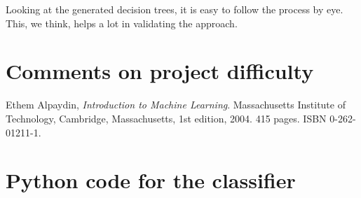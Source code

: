 \documentclass[a4paper,10pt]{article}
\begin{document}
Looking at the generated decision trees, it is easy to follow the
process by eye.  This, we think, helps a lot in validating the approach.

\section{Comments on project difficulty}

\begin{thebibliography}{9}
  Ethem Alpaydin,
  \emph{Introduction to Machine Learning}.
  Massachusetts Institute of Technology, Cambridge, Massachusetts,
  1st edition,
  2004. 415 pages. ISBN 0-262-01211-1.
\end{thebibliography}

\appendix
\section{Python code for the classifier}

\end{document}
